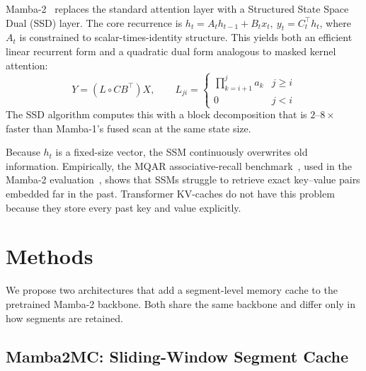 \documentclass[conference]{IEEEtran}
\begin{document}
Mamba-2~\cite{dao2024transformersssmsgeneralizedmodels} replaces the standard attention layer with a Structured State Space Dual (SSD) layer. The core recurrence is $h_t = A_t h_{t-1} + B_t x_t,\ y_t = C_t^\top h_t$, where $A_t$ is constrained to scalar-times-identity structure. This yields both an efficient linear recurrent form and a quadratic dual form analogous to masked kernel attention:
\begin{equation}
    Y = (L \circ CB^\top) X,\qquad
    L_{ji} = \begin{cases}\prod_{k=i+1}^{j} a_k & j \ge i \\ 0 & j < i\end{cases}
\end{equation}
The SSD algorithm computes this with a block decomposition that is $2$--$8\times$ faster than Mamba-1's fused scan at the same state size.

Because $h_t$ is a fixed-size vector, the SSM continuously overwrites old information. Empirically, the MQAR associative-recall benchmark~\cite{arora2023zoologymeasuringimprovingrecall}, used in the Mamba-2 evaluation~\cite{dao2024transformersssmsgeneralizedmodels}, shows that SSMs struggle to retrieve exact key--value pairs embedded far in the past. Transformer KV-caches do not have this problem because they store every past key and value explicitly.

\section{Methods}

We propose two architectures that add a segment-level memory cache to the pretrained Mamba-2 backbone. Both share the same backbone and differ only in how segments are retained.

\subsection{Mamba2MC: Sliding-Window Segment Cache}
\end{document}
